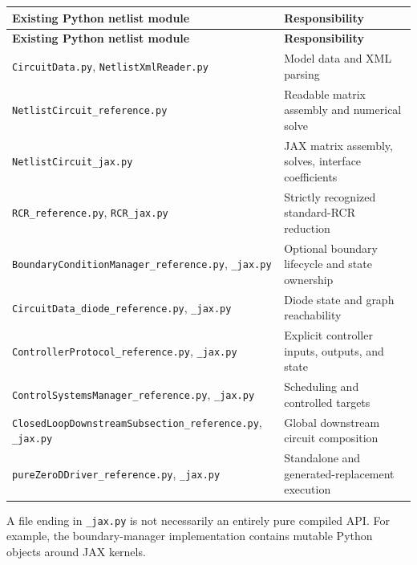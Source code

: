 \documentclass[11pt,a4paper]{article}
\begin{document}
\begingroup\footnotesize
\setlength{\tabcolsep}{4pt}
\begin{longtable}{>{\raggedright\arraybackslash}p{}>{\raggedright\arraybackslash}p{}}
\toprule
\textbf{Existing Python netlist module} & \textbf{Responsibility} \\
\midrule
\endfirsthead
\textbf{Existing Python netlist module} & \textbf{Responsibility} \\
\midrule
\endhead
\bottomrule
\endfoot
\texttt{CircuitData.\allowbreak{}py}, \texttt{NetlistXmlReader.\allowbreak{}py} & Model data and XML parsing \\
\texttt{NetlistCircuit\_\allowbreak{}reference.\allowbreak{}py} & Readable matrix assembly and numerical solve \\
\texttt{NetlistCircuit\_\allowbreak{}jax.\allowbreak{}py} & JAX matrix assembly, solves, interface coefficients \\
\texttt{RCR\_\allowbreak{}reference.\allowbreak{}py}, \texttt{RCR\_\allowbreak{}jax.\allowbreak{}py} & Strictly recognized standard-RCR reduction \\
\texttt{BoundaryConditionManager\_\allowbreak{}reference.\allowbreak{}py}, \texttt{\_\allowbreak{}jax.\allowbreak{}py} & Optional boundary lifecycle and state ownership \\
\texttt{CircuitData\_\allowbreak{}diode\_\allowbreak{}reference.\allowbreak{}py}, \texttt{\_\allowbreak{}jax.\allowbreak{}py} & Diode state and graph reachability \\
\texttt{ControllerProtocol\_\allowbreak{}reference.\allowbreak{}py}, \texttt{\_\allowbreak{}jax.\allowbreak{}py} & Explicit controller inputs, outputs, and state \\
\texttt{ControlSystemsManager\_\allowbreak{}reference.\allowbreak{}py}, \texttt{\_\allowbreak{}jax.\allowbreak{}py} & Scheduling and controlled targets \\
\texttt{ClosedLoopDownstreamSubsection\_\allowbreak{}reference.\allowbreak{}py}, \texttt{\_\allowbreak{}jax.\allowbreak{}py} & Global downstream circuit composition \\
\texttt{pureZeroDDriver\_\allowbreak{}reference.\allowbreak{}py}, \texttt{\_\allowbreak{}jax.\allowbreak{}py} & Standalone and generated-replacement execution \\
\end{longtable}
\endgroup
A file ending in \texttt{\_\allowbreak{}jax.\allowbreak{}py} is not necessarily an entirely pure compiled API. For example, the boundary-manager implementation contains mutable Python objects around JAX kernels.
\end{document}
